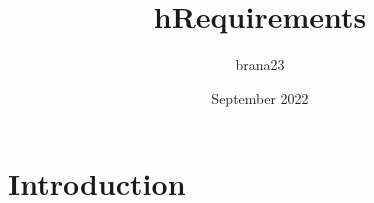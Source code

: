 \documentclass{article}
\title{h}
\author{brana23 }
\date{September 2022}
\begin{document}
\title{Requirements}

\section{Introduction}
\end{document}
